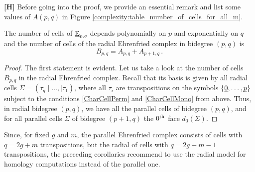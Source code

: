 {\bf [H]} Before going into the proof, we provide an essential remark and list some values of $A(p,q)$ in Figure \ref{complexity:table_number_of_cells_for_all_m}.
\begin{cor}
    The number of cells of $\underline{\smash{\mathbb E}}_{p, q}$ depends polynomially on $p$ and exponentially on $q$ and the number of cells of the radial Ehrenfried complex in bidegree $(p, q)$ is
    \[
        B_{p, q} = A_{p, q} + A_{p+1, q}\,.
    \]
\end{cor}
\begin{proof}
    The first statement is evident.
    Let us take a look at the number of cells $B_{p, q}$ in the radial Ehrenfried complex.
    Recall that its basis is given by all radial cells $\Sigma = (\tau_q \mid \dotsc, \mid \tau_1)$,
    where all $\tau_i$ are transpositions on the symbols $\{\underline{\smash{0}}, \dotsc, \underline{\smash{p}}\}$ 
    subject to the conditions \eqref{CharCellPerm} and \eqref{CharCellMono} from above.
    Thus, in radial bidegree $(p, q)$, we have all the parallel cells of bidegree $(p, q)$, 
    and for all parallel cells $\Sigma$ of bidegree $(p+1, q)$ the $0^{\text{th}}$ face $d_0(\Sigma)$.
\end{proof}
\begin{rem}
Since, for fixed $g$ and $m$, the parallel Ehrenfried complex consists of cells with $q = 2g + m$ transpositions,
but the radial of cells with $q = 2g + m - 1$ transpositions,
the preceding corollaries recommend to use the radial model for homology computations instead of the parallel one.
\end{rem}

